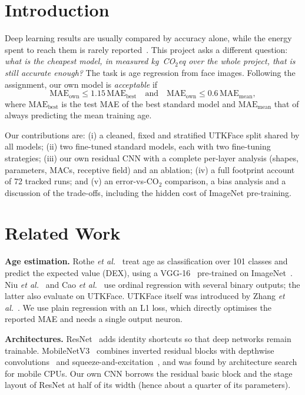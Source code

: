 \documentclass[conference,a4paper]{IEEEtran}
\newcommand{\cotwo}{CO$_2$}
\newcommand{\cotwoeq}{CO$_2$eq}
\begin{document}
\section{Introduction}
Deep learning results are usually compared by accuracy alone, while the energy spent to reach them is rarely reported~\cite{strubell2019energy,schwartz2020green}. This project asks a different question: \emph{what is the cheapest model, in measured kg~\cotwoeq{} over the whole project, that is still accurate enough?} The task is age regression from face images. Following the assignment, our own model is \emph{acceptable} if
\begin{equation}
\mathrm{MAE}_{\text{own}} \le 1.15\,\mathrm{MAE}_{\text{best}} \quad\text{and}\quad \mathrm{MAE}_{\text{own}} \le 0.6\,\mathrm{MAE}_{\text{mean}},
\label{eq:accept}
\end{equation}
where $\mathrm{MAE}_{\text{best}}$ is the test MAE of the best standard model and $\mathrm{MAE}_{\text{mean}}$ that of always predicting the mean training age.

Our contributions are: (i) a cleaned, fixed and stratified UTKFace split shared by all models; (ii) two fine-tuned standard models, each with two fine-tuning strategies; (iii) our own residual CNN with a complete per-layer analysis (shapes, parameters, MACs, receptive field) and an ablation; (iv) a full footprint account of 72 tracked runs; and (v) an error-vs-\cotwo{} comparison, a bias analysis and a discussion of the trade-offs, including the hidden cost of ImageNet pre-training.

\section{Related Work}
\textbf{Age estimation.} Rothe \emph{et al.}~\cite{rothe2015dex} treat age as classification over 101 classes and predict the expected value (DEX), using a VGG-16~\cite{simonyan2015vgg} pre-trained on ImageNet~\cite{deng2009imagenet}. Niu \emph{et al.}~\cite{niu2016ordinal} and Cao \emph{et al.}~\cite{cao2020coral} use ordinal regression with several binary outputs; the latter also evaluate on UTKFace. UTKFace itself was introduced by Zhang \emph{et al.}~\cite{zhang2017utkface}. We use plain regression with an L1 loss, which directly optimises the reported MAE and needs a single output neuron.

\textbf{Architectures.} ResNet~\cite{he2016resnet} adds identity shortcuts so that deep networks remain trainable. MobileNetV3~\cite{howard2019mobilenetv3} combines inverted residual blocks with depthwise convolutions~\cite{sandler2018mobilenetv2} and squeeze-and-excitation~\cite{hu2018se}, and was found by architecture search for mobile CPUs. Our own CNN borrows the residual basic block and the stage layout of ResNet at half of its width (hence about a quarter of its parameters).
\end{document}
